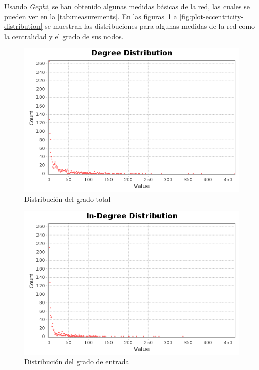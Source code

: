 Usando \textit{Gephi}, se han obtenido algunas medidas básicas de la red, las
cuales se pueden ver en la \ref{tab:measurements}. En las
figuras~\ref{fig:plot-degree-distribution} a
\ref{fig:plot-eccentricity-distribution} se muestran las distribuciones para
algunas medidas de la red como la centralidad y el grado de sus nodos.

\begin{figure}
    \includegraphics[width=\textwidth]{images/visualization/plots/degree-distribution.png}
    \caption{Distribución del grado total}
    \label{fig:plot-degree-distribution}
\end{figure}

\begin{figure}
    \includegraphics[width=\textwidth]{images/visualization/plots/indegree-distribution.png}
    \caption{Distribución del grado de entrada}
    \label{fig:plot-indegree-distribution}
\end{figure}

